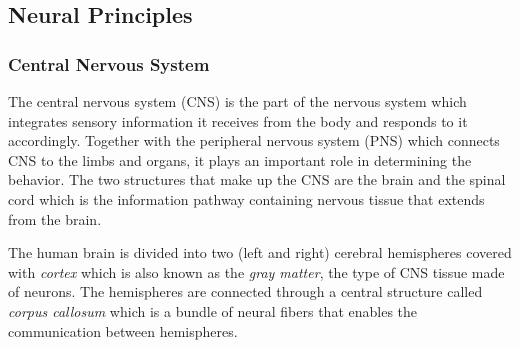 \documentclass[12pt]{article}
\newcommand\mysubsection[1]{\subsection{#1}}
\newcommand\mysubsubsection[1]{\subsubsection{#1}}
\numberwithin{equation}{section}
\numberwithin{figure}{section}
\numberwithin{table}{section}
\begin{document}
\mysubsection{Neural Principles}\label{seq:neural_principles}
\mysubsubsection{Central Nervous System}\label{seq:neural_principles_cns}
\par{
    The central nervous system (CNS) is the part of the nervous system which
    integrates sensory information it receives from the body and responds to it accordingly.
    Together with the peripheral nervous system (PNS) which connects CNS to the
    limbs and organs, it plays an important role in determining the behavior. The two
    structures that make up the CNS are the brain and the spinal cord which is the
    information pathway containing nervous tissue that extends from the brain.
}
\par{
    The human brain is divided into two (left and right) cerebral hemispheres
    covered with \emph{cortex} which is also known as the \emph{gray matter},
    the type of CNS tissue made of neurons. The hemispheres are connected
    through a central structure called \emph{corpus callosum} which is a bundle
    of neural fibers that enables the communication between hemispheres.
}
\end{document}
